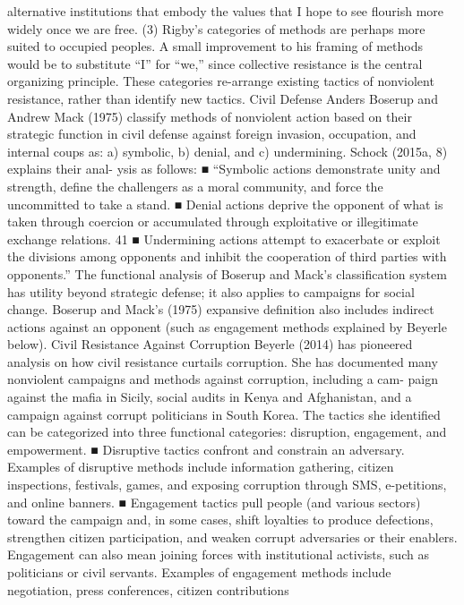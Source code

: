 \documentclass[twoside,a4paper,12pt,fleqn,openany]{extbook}
\begin{document}
alternative institutions that embody the values that I hope to see flourish more widely
once we are free. (3)
Rigby’s categories of methods are perhaps more suited to occupied peoples. A small
improvement to his framing of methods would be to substitute “I” for “we,” since collective
resistance is the central organizing principle. These categories re-arrange existing tactics of
nonviolent resistance, rather than identify new tactics.
Civil Defense
Anders Boserup and Andrew Mack (1975) classify methods of nonviolent action based on
their strategic function in civil defense against foreign invasion, occupation, and internal
coups as: a) symbolic, b) denial, and c) undermining. Schock (2015a, 8) explains their anal-
ysis as follows:
■
“Symbolic actions demonstrate unity and strength, define the challengers as a moral
community, and force the uncommitted to take a stand.
■
Denial actions deprive the opponent of what is taken through coercion or accumulated
through exploitative or illegitimate exchange relations.
41
■
Undermining actions attempt to exacerbate or exploit the divisions among opponents
and inhibit the cooperation of third parties with opponents.”
The functional analysis of Boserup and Mack’s classification system has utility beyond
strategic defense; it also applies to campaigns for social change. Boserup and Mack’s (1975)
expansive definition also includes indirect actions against an opponent (such as engagement
methods explained by Beyerle below).
Civil Resistance Against Corruption
Beyerle (2014) has pioneered analysis on how civil resistance curtails corruption. She has
documented many nonviolent campaigns and methods against corruption, including a cam-
paign against the mafia in Sicily, social audits in Kenya and Afghanistan, and a campaign
against corrupt politicians in South Korea. The tactics she identified can be categorized into
three functional categories: disruption, engagement, and empowerment.
■
Disruptive tactics confront and constrain an adversary. Examples of disruptive methods
include information gathering, citizen inspections, festivals, games, and exposing
corruption through SMS, e-petitions, and online banners.
■
 Engagement tactics pull people (and various sectors) toward the campaign and, in
some cases, shift loyalties to produce defections, strengthen citizen participation, and
weaken corrupt adversaries or their enablers. Engagement can also mean joining
forces with institutional activists, such as politicians or civil servants. Examples of
engagement methods include negotiation, press conferences, citizen contributions
\end{document}
